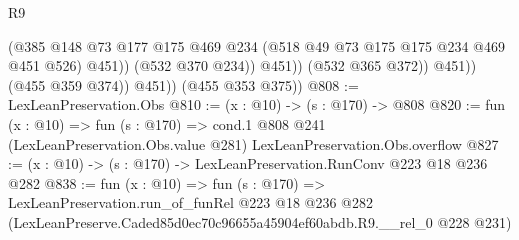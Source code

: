 \begin{lexlean}{R9}
\begin{coremodule}
                          (@385
                            @148
                            @73
                            @177
                            @175
                            @469
                            @234
                            (@518 @49 @73 @175 @175 @234 @469 @451 @526)
                            @451))
                        (@532 @370 @234))
                      @451))
                  (@532 @365 @372))
                @451))
            (@455 @359 @374))
          @451))
      (@455 @353 @375))
@808 := LexLeanPreservation.Obs
@810 := (x : @10) -> (s : @170) -> @808
@820 := fun (x : @10) =>
  fun (s : @170) =>
  cond.{1} @808 @241 (LexLeanPreservation.Obs.value @281) LexLeanPreservation.Obs.overflow
@827 := (x : @10) -> (s : @170) -> LexLeanPreservation.RunConv @223 @18 @236 @282
@838 := fun (x : @10) =>
  fun (s : @170) =>
  LexLeanPreservation.run_of_funRel
    @223
    @18
    @236
    @282
    (LexLeanPreserve.Caded85d0ec70c96655a45904ef60abdb.R9.__rel_0 @228 @231)
\end{coremodule}
\end{lexlean}
